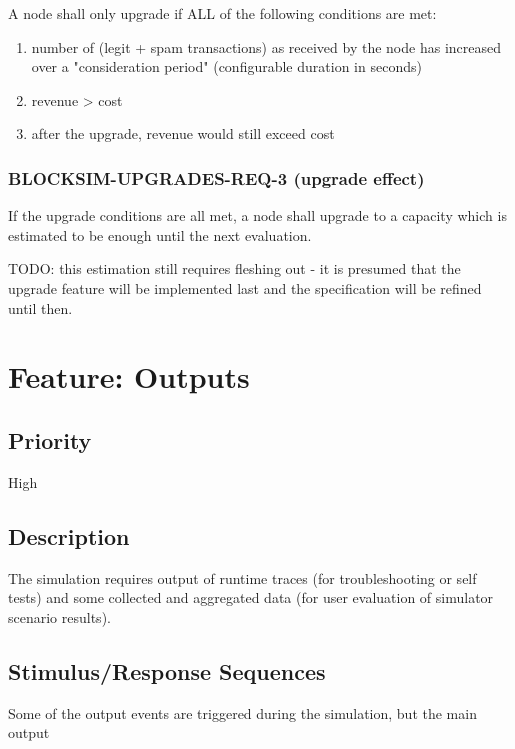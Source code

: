 \documentclass{scrreprt}
\begin{document}
A node shall only upgrade if ALL of the following conditions are met:

\begin{enumerate}
   \item number of (legit + spam transactions) as received by the node has increased
over a "consideration period" (configurable duration in seconds)

   \item revenue > cost

   \item after the upgrade, revenue would still exceed cost
\end{enumerate}


\subsubsection{BLOCKSIM-UPGRADES-REQ-3 (upgrade effect)}
If the upgrade conditions are all met, a node shall upgrade to a capacity
which is estimated to be enough until the next evaluation.

TODO: this estimation still requires fleshing out - it is presumed that
the upgrade feature will be implemented last and the specification will
be refined until then.



\section{Feature: Outputs}

\subsection{Priority}

High


\subsection{Description}

The simulation requires output of runtime traces (for troubleshooting or
self tests) and some collected and aggregated data (for user evaluation of
simulator scenario results).


\subsection{Stimulus/Response Sequences}

Some of the output events are triggered during the simulation, but the
main output
\end{document}
